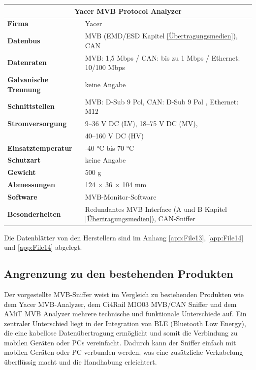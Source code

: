 \hfill
\begin{minipage}{0.57\textwidth}
  \begin{tabular}{|m{3cm}|m{4.5cm}|}
    \hline
    \multicolumn{2}{|c|}{\textbf{Yacer MVB Protocol Analyzer}} \\ \hline
    \textbf{Firma} & Yacer \\ \hline
    \textbf{Datenbus} & MVB (EMD/ESD Kapitel \ref{Übertragungsmedien}), CAN \\ \hline
    \textbf{Datenraten} & MVB: 1,5 Mbps / CAN: bis zu 1 Mbps / Ethernet: 10/100 Mbps \\ \hline
    \textbf{Galvanische \mbox{Trennung}} & keine Angabe \\ \hline
    \textbf{Schnittstellen} & MVB: D-Sub 9 Pol, CAN: D-Sub 9 Pol , Ethernet: M12 \\ \hline
    \textbf{Stromversorgung} & 9–36 V DC (LV), 18–75 V DC (MV), \\ 
                                & 40–160 V DC (HV) \\ \hline
    \textbf{Einsatztemperatur} & -40 °C bis 70 °C \\ \hline
    \textbf{Schutzart} & keine Angabe \\ \hline
    \textbf{Gewicht} & 500 g \\ \hline
    \textbf{Abmessungen} & 124 × 36 × 104 mm \\ \hline
    \textbf{Software} & MVB-Monitor-Software \\ \hline
    \textbf{Besonderheiten} & Redundantes MVB Interface (A und B Kapitel \ref{Übertragungsmedien}), CAN-Sniffer \\ \hline
  \end{tabular}
\end{minipage}

Die Datenblätter von den Herstellern sind im Anhang \ref{app:File13}, \ref{app:File14} und \ref{app:File14} abgelegt.


\subsection{Angrenzung zu den bestehenden Produkten}

Der vorgestellte MVB-Sniffer weist im Vergleich zu bestehenden Produkten wie dem Yacer MVB-Analyzer, dem Ci4Rail MIO03 MVB/CAN Sniffer und dem AMiT MVB Analyzer mehrere technische und funktionale Unterschiede auf. Ein zentraler Unterschied liegt in der Integration von BLE (Bluetooth Low Energy), die eine kabellose Datenübertragung ermöglicht und somit die Verbindung zu mobilen Geräten oder PCs vereinfacht. Dadurch kann der Sniffer einfach mit mobilen Geräten oder PC verbunden werden, was eine zusätzliche Verkabelung überflüssig macht und die Handhabung erleichtert.

